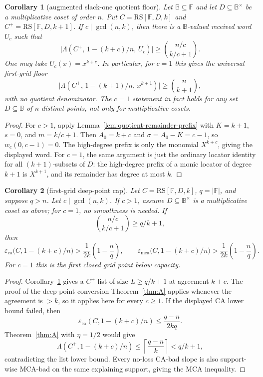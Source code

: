 \documentclass[11pt]{article}
\newtheorem{corollary}[corollary]{Corollary}
\theoremstyle{definition}
\theoremstyle{remark}
\newcommand{\F}{\mathbb{F}}
\newcommand{\B}{\mathbb{B}}
\newcommand{\RS}{\mathrm{RS}}
\newcommand{\eca}{\varepsilon_{\mathrm{ca}}}
\newcommand{\emca}{\varepsilon_{\mathrm{mca}}}
\newcommand{\Lst}{\Lambda}
\begin{document}
\begin{corollary}[augmented slack-one quotient floor]
\label{cor:augmented-slack-one}
Let $\B\subseteq\F$ and let $D\subseteq\B^\times$ be a multiplicative coset
of order $n$.  Put $C=\RS[\F,D,k]$ and $C^+=\RS[\F,D,k+1]$.  If
$c\mid\gcd(n,k)$, then there is a $\B$-valued received word $U_c$ such that
\[
        \bigl|\Lst(C^+,\,1-(k+c)/n,\,U_c)\bigr|
        \ge
        \binom{n/c}{k/c+1} .
\]
One may take $U_c(x)=x^{k+c}$.  In particular, for $c=1$ this gives the
universal first-grid floor
\[
        \bigl|\Lst(C^+,\,1-(k+1)/n,\,x^{k+1})\bigr|
        \ge
        \binom n{k+1},
\]
with no quotient denominator.  The $c=1$ statement in fact holds for any set
$D\subseteq\B$ of $n$ distinct points, not only for multiplicative cosets.
\end{corollary}

\begin{proof}
For $c>1$, apply Lemma~\ref{lem:quotient-remainder-prefix} with $K=k+1$,
$s=0$, and $m=k/c+1$.  Then $A_0=k+c$ and $\sigma=A_0-K=c-1$, so
$w_c(0,c-1)=0$.  The high-degree prefix is only the monomial $X^{k+c}$, giving
the displayed word.  For $c=1$, the same argument is just the ordinary locator
identity for all $(k+1)$-subsets of $D$: the high-degree prefix of a monic
locator of degree $k+1$ is $X^{k+1}$, and its remainder has degree at most $k$.
\end{proof}

\begin{corollary}[first-grid deep-point cap]
\label{cor:first-grid-cap}
Let $C=\RS[\F,D,k]$, $q=|\F|$, and suppose $q>n$.  Let
$c\mid\gcd(n,k)$.  If $c>1$, assume $D\subseteq\B^\times$ is a
multiplicative coset as above; for $c=1$, no smoothness is needed.  If
\[
        \binom{n/c}{k/c+1}\ge q/k+1,
\]
then
\[
        \eca\bigl(C,1-(k+c)/n\bigr)
        >\frac1{2k}\left(1-\frac nq\right),
        \qquad
        \emca\bigl(C,1-(k+c)/n\bigr)
        >\frac1{2k}\left(1-\frac nq\right).
\]
For $c=1$ this is the first closed grid point below capacity.
\end{corollary}

\begin{proof}
Corollary~\ref{cor:augmented-slack-one} gives a $C^+$-list of size
$L\ge q/k+1$ at agreement $k+c$.  The proof of the deep-point conversion
Theorem~\ref{thm:A} applies whenever the agreement is $>k$, so it applies here
for every $c\ge1$.  If the displayed CA lower bound failed, then
\[
        \eca(C,1-(k+c)/n)\le \frac{q-n}{2kq}.
\]
Theorem~\ref{thm:A} with $\eta=1/2$ would give
\[
        \Lst(C^+,1-(k+c)/n)
        \le
        \left\lceil \frac{q-n}{k}\right\rceil
        < q/k+1,
\]
contradicting the list lower bound.  Every no-loss CA-bad slope is also
support-wise MCA-bad on the same explaining support, giving the MCA inequality.
\end{proof}
\end{document}
